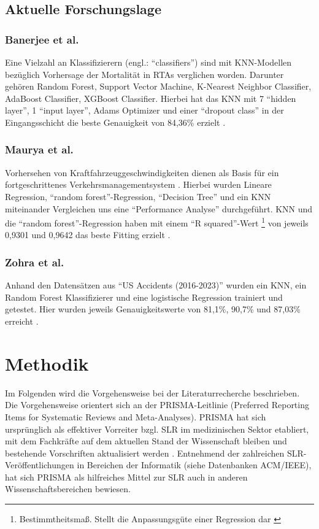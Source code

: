 \documentclass{scrartcl}
\begin{document}
\subsection{Aktuelle Forschungslage}

\subsubsection{Banerjee et al.}
Eine Vielzahl an Klassifizierern (engl.: \enquote{classifiers}) sind mit
KNN-Modellen bezüglich Vorhersage der Mortalität in RTAs verglichen worden.
Darunter gehören
Random Forest, Support Vector Machine, K-Nearest Neighbor Classifier,
AdaBoost Classifier, XGBoost Classifier. Hierbei hat das KNN mit 7
\enquote{hidden layer}, 1 \enquote{input layer}, Adams Optimizer und einer
\enquote{dropout class} in der Eingangsschicht die beste Genauigkeit von 84,36\%
erzielt \cite{akt1}.

\subsubsection{Maurya et al.}
Vorhersehen von Kraftfahrzeuggeschwindigkeiten dienen als Basis für ein
fortgeschrittenes Verkehrsmanagementsystem \cite{akt2}. Hierbei wurden
Lineare Regression, \enquote{random forest}-Regression, \enquote{Decision Tree} und
ein KNN miteinander Vergleichen uns eine \enquote{Performance Analyse} durchgeführt.
KNN und die \enquote{random forest}-Regression haben mit einem
\enquote{R squared}-Wert \footnote{Bestimmtheitsmaß.
   Stellt die Anpassungsgüte einer Regression dar \cite{rsquared}}
von jeweils 0,9301 und 0,9642 das beste Fitting erzielt \cite{akt2}.

\subsubsection{Zohra et al.}
Anhand den Datensätzen aus \enquote{US Accidents (2016-2023)} wurden ein KNN,
ein Random Forest Klassifizierer und eine logistische Regression trainiert und
getestet. Hier wurden jeweils Genauigkeitswerte von 81,1\%, 90,7\% und 87,03\%
erreicht \cite{akt3}.


\section{Methodik}
Im Folgenden wird die Vorgehensweise bei der Literaturrecherche beschrieben.
Die Vorgehensweise orientert sich an der PRISMA-Leitlinie (Preferred Reporting
Items for Systematic Reviews and Meta-Analyses). PRISMA hat sich ursprünglich
als effektiver Vorreiter bzgl. SLR im medizinischen Sektor etabliert, mit dem
Fachkräfte auf dem aktuellen Stand der Wissenschaft bleiben und bestehende
Vorschriften aktualisiert werden \cite{prisma}. Entnehmend der zahlreichen
SLR-Veröffentlichungen in Bereichen der Informatik (siehe Datenbanken ACM/IEEE),
hat sich PRISMA als hilfreiches Mittel zur SLR auch in anderen
Wissenschaftsbereichen bewiesen.
\end{document}
